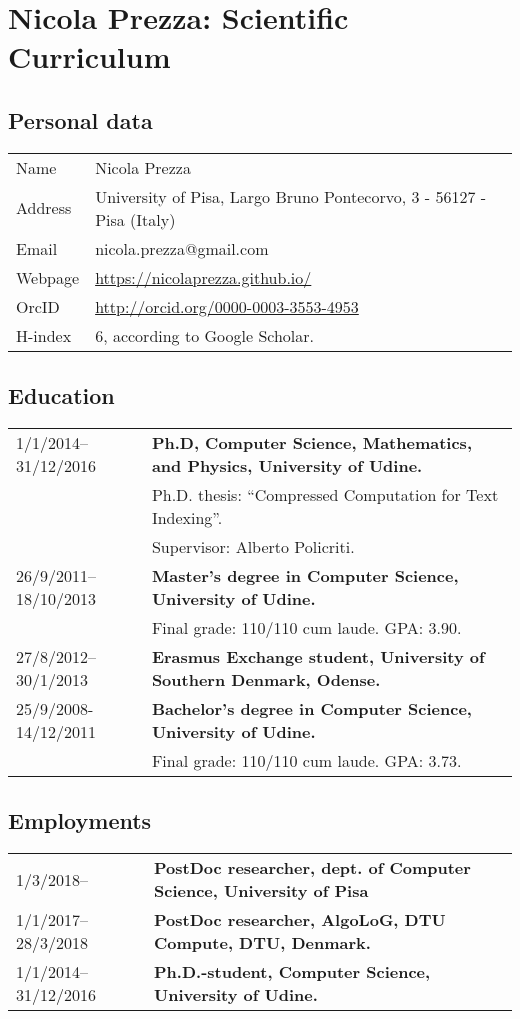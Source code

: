 \documentclass{article}
\begin{document}
\section*{Nicola Prezza: Scientific Curriculum}
\subsection*{Personal data}
\begin{tabular}{p{2cm} p{10cm}}
Name & Nicola Prezza\\
Address & University of Pisa, Largo Bruno Pontecorvo, 3 - 56127 - Pisa (Italy)\\
Email & nicola.prezza@gmail.com\\
Webpage & \url{https://nicolaprezza.github.io/}\\
OrcID & \url{http://orcid.org/0000-0003-3553-4953}\\
H-index & 6, according to Google Scholar.
\end{tabular}

\subsection*{Education}
\begin{tabular}{p{2cm} p{10cm}}
1/1/2014--31/12/2016 & \textbf{Ph.D, Computer Science, Mathematics, and Physics, University of Udine.}\\
& Ph.D. thesis: ``Compressed Computation for Text Indexing''.\\
& Supervisor: Alberto Policriti.\\
26/9/2011--18/10/2013 & \textbf{Master’s degree in Computer Science, University of Udine.}\\
&Final grade: 110/110 cum laude. GPA: 3.90.\\
27/8/2012--30/1/2013 & \textbf{Erasmus Exchange student, University of Southern Denmark, Odense.}\\
25/9/2008-14/12/­2011 & \textbf{Bachelor’s degree in Computer Science, University of Udine.}\\
& Final grade: 110/110 cum laude. GPA: 3.73.
\end{tabular}

\subsection*{Employments}
\begin{tabular}{p{2cm} p{10cm}}
	1/3/2018--&\textbf{PostDoc researcher, dept. of Computer Science, University of Pisa}\\
	1/1/2017--28/3/2018&\textbf{PostDoc researcher, AlgoLoG, DTU Compute, DTU, Denmark.}\\
	1/1/2014--31/12/2016 & \textbf{Ph.D.-student, Computer Science, University of Udine.}\\
\end{tabular}
\end{document}
